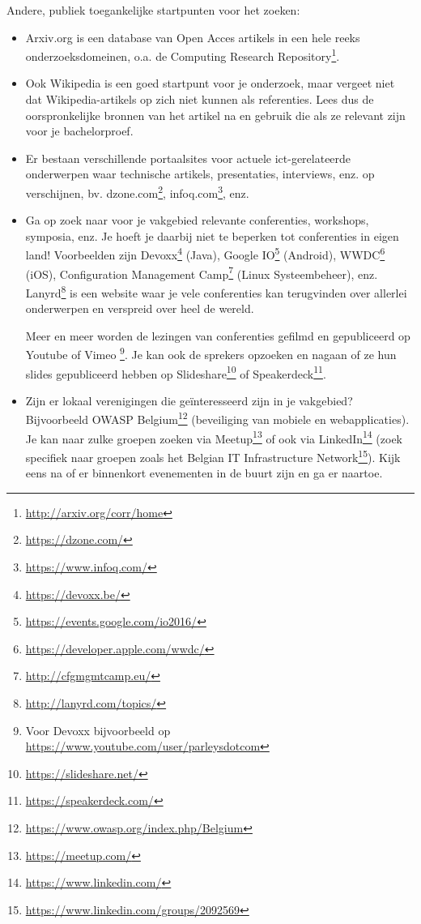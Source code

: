 Andere, publiek toegankelijke startpunten voor het zoeken:

\begin{itemize}
  \item Arxiv.org is een database van Open Acces artikels in een hele reeks onderzoeksdomeinen, o.a. de Computing Research Repository\footnote{\url{http://arxiv.org/corr/home}}.
  
  \item Ook Wikipedia is een goed startpunt voor je onderzoek, maar vergeet niet dat Wikipedia-artikels op zich niet kunnen als referenties. Lees dus de oorspronkelijke bronnen van het artikel na en gebruik die als ze relevant zijn voor je bachelorproef.
  
  \item Er bestaan verschillende portaalsites voor actuele ict-gerelateerde onderwerpen waar technische artikels, presentaties, interviews, enz. op verschijnen, bv. dzone.com\footnote{\url{https://dzone.com/}}, infoq.com\footnote{\url{https://www.infoq.com/}}, enz.
  
  \item Ga op zoek naar voor je vakgebied relevante conferenties, workshops, symposia, enz. Je hoeft je daarbij niet te beperken tot conferenties in eigen land! Voorbeelden zijn Devoxx\footnote{\url{https://devoxx.be/}} (Java), Google IO\footnote{\url{https://events.google.com/io2016/}} (Android), WWDC\footnote{\url{https://developer.apple.com/wwdc/}} (iOS), Configuration Management Camp\footnote{\url{http://cfgmgmtcamp.eu/}} (Linux Systeembeheer), enz. Lanyrd\footnote{\url{http://lanyrd.com/topics/}} is een website waar je vele conferenties kan terugvinden over allerlei onderwerpen en verspreid over heel de wereld.
  
  Meer en meer worden de lezingen van conferenties gefilmd en gepubliceerd op Youtube of Vimeo \footnote{Voor Devoxx bijvoorbeeld op \url{https://www.youtube.com/user/parleysdotcom}}. Je kan ook de sprekers opzoeken en nagaan of ze hun slides gepubliceerd hebben op Slideshare\footnote{\url{https://slideshare.net/}} of Speakerdeck\footnote{\url{https://speakerdeck.com/}}.
  
  \item Zijn er lokaal verenigingen die geïnteresseerd zijn in je vakgebied? Bijvoorbeeld OWASP Belgium\footnote{\url{https://www.owasp.org/index.php/Belgium}} (beveiliging van mobiele en webapplicaties). Je kan naar zulke groepen zoeken via Meetup\footnote{\url{https://meetup.com/}} of ook via LinkedIn\footnote{\url{https://www.linkedin.com/}} (zoek specifiek naar groepen zoals het Belgian IT Infrastructure Network\footnote{\url{https://www.linkedin.com/groups/2092569}}). Kijk eens na of er binnenkort evenementen in de buurt zijn en ga er naartoe.
  

\end{itemize}
